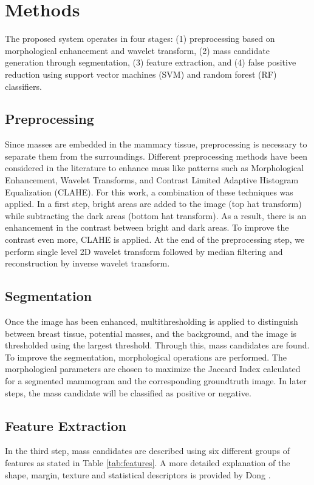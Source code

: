 \section{Methods}
\label{sec:method}
The proposed system operates in four stages: (1) preprocessing based on morphological enhancement and wavelet transform, (2) mass candidate generation through segmentation, (3) feature extraction, and (4) false positive reduction using support vector machines (SVM) and random forest (RF) classifiers. 
\subsection{Preprocessing}
Since masses are embedded in the mammary tissue, preprocessing is necessary to separate them from the surroundings. Different preprocessing methods have been considered in the literature to enhance mass like patterns such as Morphological Enhancement, Wavelet Transforms, and Contrast Limited Adaptive Histogram Equalization (CLAHE). For this work, a combination of these techniques was applied. In a first step, bright areas are added to the image (top hat transform) while subtracting the dark areas (bottom hat transform). As a result, there is an enhancement in the contrast between bright and dark areas. To improve the contrast even more, CLAHE is applied. At the end of the preprocessing step, we perform single level 2D wavelet transform followed by median filtering and reconstruction by inverse wavelet transform.

\subsection{Segmentation}
Once the image has been enhanced, multithresholding is applied to distinguish between breast tissue, potential masses, and the background, and the image is thresholded using the largest threshold. Through this, mass candidates are found. To improve the segmentation, morphological operations are performed. The morphological parameters are chosen to maximize the Jaccard Index calculated for a segmented mammogram and the corresponding groundtruth image. In later steps, the mass candidate will be classified as positive or negative.

\subsection{Feature Extraction}
In the third step, mass candidates are described using six different groups of features as stated in Table \ref{tab:features}. A more detailed explanation of the shape, margin, texture and statistical descriptors is provided by Dong \cite{Dong2015}.

